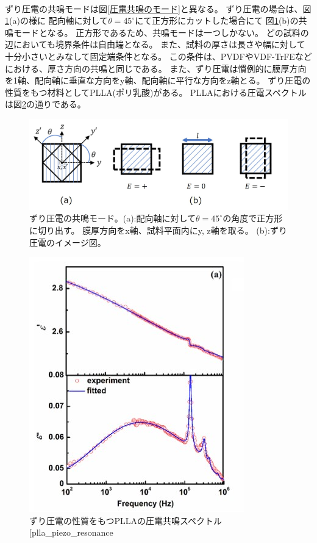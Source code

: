 \documentclass[dvipdfmx,12pt,a4paper]{jreport}
\makeatletter
\DeclareRobustCommand\cite{\unskip
    	\@ifnextchar[{\@tempswatrue\@citex}{\@tempswafalse\@citex[]}}
\makeatother
\begin{document}
			\\
			ずり圧電の共鳴モードは図\ref{圧電共鳴のモード}と異なる。
			ずり圧電の場合は、図\ref{ずり圧電の共鳴モード}(a)の様に
			配向軸に対して$\theta=45^\circ$にて正方形にカットした場合にて
			図\ref{ずり圧電の共鳴モード}(b)の共鳴モードとなる。
			正方形であるため、共鳴モードは一つしかない。
			どの試料の辺においても境界条件は自由端となる。
			また、試料の厚さは長さや幅に対して十分小さいとみなして固定端条件となる。
			この条件は、PVDFやVDF-TrFEなどにおける、厚さ方向の共鳴と同じである。
			また、ずり圧電は慣例的に膜厚方向を1軸、配向軸に垂直な方向をy軸、配向軸に平行な方向をz軸とる。
			ずり圧電の性質をもつ材料としてPLLA(ポリ乳酸)がある。
			PLLAにおける圧電スペクトルは図\ref{PLLA_piezo_resonance}の通りである。
			\begin{figure}[h]
				\centering
				\includegraphics[width=0.8\linewidth]{ずり圧電_共鳴モード.jpg}
				\caption{ずり圧電の共鳴モード。(a):配向軸に対して$\theta=45^\circ$の角度で正方形に切り出す。
				膜厚方向をx軸、試料平面内にy, z軸を取る。
				(b):ずり圧電のイメージ図。}
				\label{ずり圧電の共鳴モード}
			\end{figure}
			\begin{figure}[h]
				\centering
				\includegraphics{PLLA_圧電共鳴スペクトル.jpg}
				\caption{ずり圧電の性質をもつPLLAの圧電共鳴スペクトル\cite{plla_piezo_resonance}}
				\label{PLLA_piezo_resonance}
			\end{figure}
\end{document}
